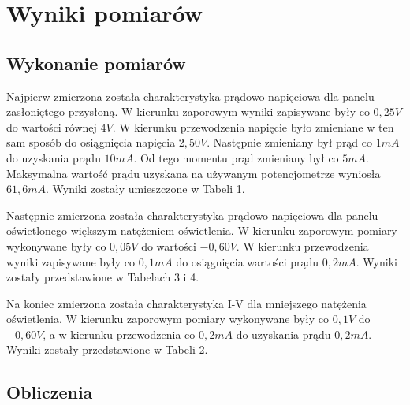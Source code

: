\documentclass[polish, 11pt, a4paper]{article}
\begin{document}
	\section{Wyniki pomiarów}
		
	\subsection{Wykonanie pomiarów}
		Najpierw zmierzona została charakterystyka prądowo napięciowa dla panelu zasłoniętego przysłoną. W kierunku zaporowym wyniki zapisywane były co \(0,25V\) do wartości równej \(4V\). W kierunku przewodzenia napięcie było zmieniane w ten sam sposób do osiągnięcia napięcia \(2,50V\). Następnie zmieniany był prąd co \(1mA\) do uzyskania prądu \(10mA\). Od tego momentu prąd zmieniany był co \(5mA\). Maksymalna wartość prądu uzyskana na używanym potencjometrze wyniosła \(61,6mA\). Wyniki zostały umieszczone w Tabeli 1.
		
		Następnie zmierzona została charakterystyka prądowo napięciowa dla panelu oświetlonego większym natężeniem oświetlenia. W kierunku zaporowym pomiary wykonywane były co \(0,05V\) do wartości \(-0,60V\). W kierunku przewodzenia wyniki zapisywane były co \(0,1mA\) do osiągnięcia wartości prądu \(0,2mA\). Wyniki zostały przedstawione w Tabelach 3 i 4.
		
		Na koniec zmierzona została charakterystyka I-V dla mniejszego natężenia oświetlenia. W kierunku zaporowym pomiary wykonywane były co \(0,1V\) do \(-0,60V\), a w kierunku przewodzenia co \(0,2mA\) do uzyskania prądu \(0,2mA\). Wyniki zostały przedstawione w Tabeli 2.
	\subsection{Obliczenia}
\end{document}
